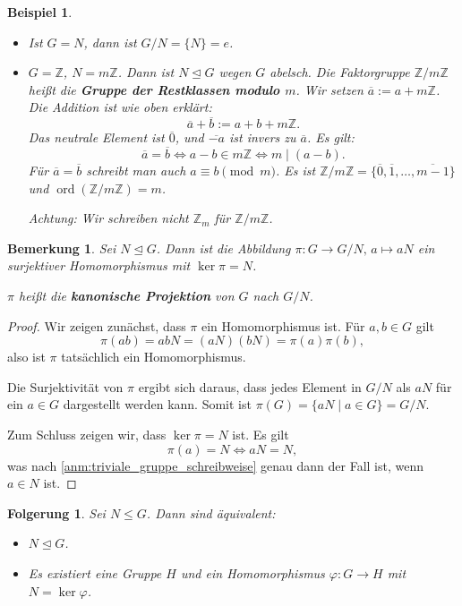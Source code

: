 \documentclass[a4paper, twoside, 11pt, ngerman]{report}
\newcommand{\ZZ}{\mathds Z}
\DeclareMathOperator{\ord}{ord}
\theoremstyle{definistyle}
\newtheorem{bem}[satz]{Bemerkung}
\newtheorem{folgerung}[satz]{Folgerung}
\newtheorem{bsp}[satz]{Beispiel}
\theoremstyle{remark}
\newcommand{\defn}[1]{\textit{\bfseries #1}}
\begin{document}
\begin{bsp}\label{bsp:zyklische_faktorgruppe}
\begin{itemize}
    \item[(a)] Ist $G = N$, dann ist $G / N = \{N\}= e$.
    
    \item[(b)] $G = \ZZ$, $N = m\ZZ$. Dann ist $N \trianglelefteq G$ wegen $G$ abelsch.   
    Die Faktorgruppe $\ZZ / m\ZZ$ heißt die \defn{Gruppe der Restklassen modulo $m$}.
    Wir setzen $\overline{a} := a + m\ZZ$. Die Addition ist wie oben erklärt:
    \[
    \overline{a} + \overline{b} := a + b + m\ZZ.
    \]
    Das neutrale Element ist $\overline{0}$, und $\overline{-a}$ ist invers zu $\overline{a}$.
    Es gilt: \[\overline{a} = \overline{b} \Leftrightarrow a - b \in m\ZZ \Leftrightarrow m \mid (a - b).\]
    Für $\overline{a} = \overline{b}$ schreibt man auch $a \equiv b \pmod{m}$.
    Es ist $\ZZ / m\ZZ = \{\overline{0}, \overline{1}, \dots, \overline{m-1}\}$ und $\ord(\ZZ / m\ZZ) = m$.
    
    Achtung: Wir schreiben nicht $\ZZ_m$ für $\ZZ / m\ZZ$.
\end{itemize}
\end{bsp}

\begin{bem}\label{bem:kanonische_projektion}
Sei $N \trianglelefteq G$. Dann ist die Abbildung $\pi \colon G \to G/N, \, a \mapsto aN$ ein surjektiver Homomorphismus mit $\ker \pi = N$. 

$\pi$ heißt die \defn{kanonische Projektion} von $G$ nach $G/N$.
\end{bem}

\begin{proof}
Wir zeigen zunächst, dass $\pi$ ein Homomorphismus ist. Für $a, b \in G$ gilt
\[
\pi(ab) = abN = (aN)(bN) = \pi(a) \pi(b),
\]
also ist $\pi$ tatsächlich ein Homomorphismus.

Die Surjektivität von $\pi$ ergibt sich daraus, dass jedes Element in $G/N$ als $aN$ für ein $a \in G$ dargestellt werden kann. Somit ist $\pi(G) = \{aN \mid a \in G\} = G / N$.

Zum Schluss zeigen wir, dass $\ker \pi = N$ ist. Es gilt \[\pi(a) = N \Leftrightarrow aN = N,\] was nach \ref{anm:triviale_gruppe_schreibweise} genau dann der Fall ist, wenn $a \in N$ ist.
\end{proof}

\begin{folgerung}\label{folgerung:normalteiler_faktorisierte_gruppe}
Sei $N \leq G$. Dann sind äquivalent:
\begin{itemize}
    \item[(i)] $N \trianglelefteq G$.
    \item[(ii)] Es existiert eine Gruppe $H$ und ein Homomorphismus $\varphi \colon G \to H$ mit $N = \ker \varphi$.
\end{itemize}
\end{folgerung}
\end{document}
